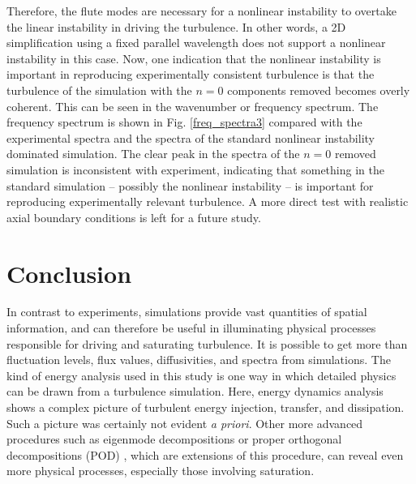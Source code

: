 \documentclass[showpacs,preprintnumbers,amsmath,amssymb,superscriptaddress]{revtex4}
\begin{document}
Therefore, the flute modes are necessary for a nonlinear instability to overtake the linear instability in driving the turbulence. In other words, a 2D simplification
using a fixed parallel wavelength does not support a nonlinear instability in this case.
Now, one indication that the nonlinear instability is important in reproducing experimentally consistent turbulence 
is that the turbulence of the simulation with the $n=0$ components removed becomes overly coherent. This can be seen in the
wavenumber or frequency spectrum. The frequency spectrum is shown in Fig. \ref{freq_spectra3} compared with the experimental spectra and the spectra of the standard nonlinear instability
dominated simulation. The clear peak in the spectra of the $n=0$ removed simulation is inconsistent with experiment, indicating that something in the standard simulation -- possibly
the nonlinear instability -- is important for reproducing experimentally relevant turbulence. A more direct test with realistic axial boundary conditions is left for a future study.


\section{Conclusion}

In contrast to experiments, simulations provide vast quantities of spatial information, and can therefore be useful in illuminating physical processes responsible for driving and saturating
turbulence. It is possible to get more than fluctuation levels, flux values, diffusivities, and spectra from simulations. The kind of energy analysis used in this study is one 
way in which detailed physics can be drawn from a turbulence simulation. Here, energy dynamics analysis shows a complex picture of turbulent energy injection, transfer, and dissipation. 
Such a picture was certainly not evident \emph{a priori}.
Other more advanced procedures such as eigenmode decompositions \cite{baver2002} or proper orthogonal decompositions (POD) \cite{hatch2011}, which are extensions of this procedure,
can reveal even more physical processes, especially those involving saturation. 
\end{document}
